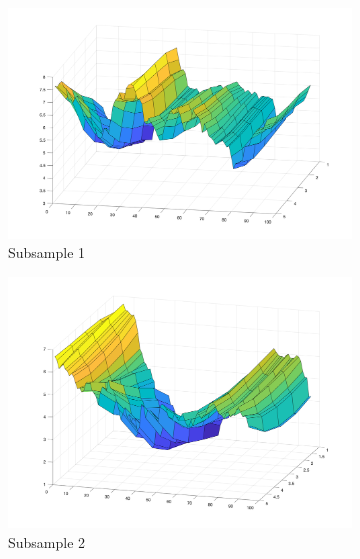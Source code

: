 \begin{figure}
     \centering
     \begin{subfigure}[b]{0.45\textwidth}
         \centering
         \includegraphics[width=\textwidth]{figures/sample1}
         \caption{Subsample 1}
         \label{fig:subsample1}
     \end{subfigure}
     \begin{subfigure}[b]{0.45\textwidth}
         \centering
         \includegraphics[width=\textwidth]{figures/sample2}
         \caption{Subsample 2}
         \label{fig:subsample2}
     \end{subfigure}
     \begin{subfigure}[b]{0.45\textwidth}
         \centering

\end{subfigure}
\end{figure}
